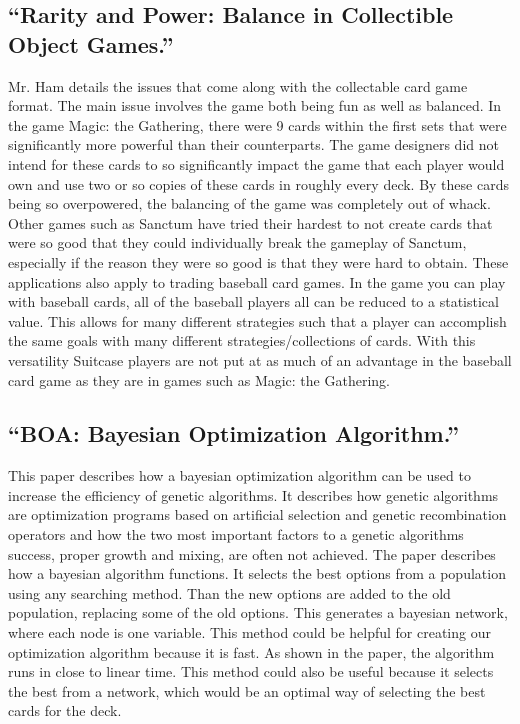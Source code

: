 \documentclass[12pt, letterpaper]{article}
\begin{document}
\subsection{\enquote{Rarity and Power: Balance in Collectible Object Games.}}
\label{sec:3.2}

Mr. Ham details the issues that come along with the collectable card game format.
The main issue involves the game both being fun as well as balanced.
In the game Magic: the Gathering,
there were 9 cards within the first sets that were significantly more powerful than their counterparts.
The game designers did not intend for these cards to so
significantly impact the game that each player would own and use two or so copies of these cards in roughly every deck.
By these cards being so overpowered, the balancing of the game was completely out of whack.
Other games such as Sanctum have tried their hardest to not create cards
that were so good that they could individually break the gameplay of
Sanctum, especially if the reason they were so good is that they were hard to obtain.
These applications also apply to trading baseball card games.
In the game you can play with baseball cards, all of the baseball players all can be reduced to a statistical value.
This allows for many different strategies such that a player can accomplish the same
goals with many different strategies/collections of cards.
With this versatility Suitcase players are not put at as much
of an advantage in the baseball card game as they are in games such as Magic: the Gathering.

\subsection{\enquote{BOA: Bayesian Optimization Algorithm.}}
\label{sec:3.3}

This paper describes how a bayesian optimization algorithm can be used to increase the efficiency of genetic algorithms.
It describes how genetic algorithms are optimization programs
based on artificial selection and genetic recombination operators
and how the two most important factors to a genetic algorithms success, proper growth and mixing, are often not achieved.
The paper describes how a bayesian algorithm functions.
It selects the best options from a population using any searching method.
Than the new options are added to the old population, replacing some of the old options.
This generates a bayesian network, where each node is one variable.
This method could be helpful for creating our optimization algorithm because it is fast.
As shown in the paper, the algorithm runs in close to linear time.
This method could also be useful because it selects the best from a network,
which would be an optimal way of selecting the best cards for the deck.
\end{document}
